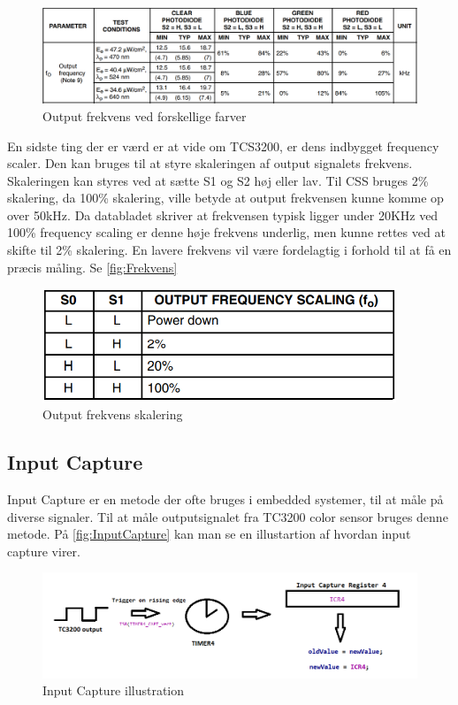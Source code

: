 \begin{figure}[H]
	\centering
	\includegraphics[width = 500pt]{Img/FarveSpektrum.png}
	\caption{Output frekvens ved forskellige farver}
	\label{fig:FarveSpektrum}
\end{figure}

En sidste ting der er værd er at vide om TCS3200, er dens indbygget frequency scaler. Den kan bruges til at styre skaleringen af output signalets frekvens. Skaleringen kan styres ved at sætte S1 og S2 høj eller lav. Til CSS bruges 2\% skalering, da 100\% skalering, ville betyde at output frekvensen kunne komme op over 50kHz. Da databladet skriver at frekvensen typisk ligger under 20KHz ved 100\% frequency scaling er denne høje frekvens underlig, men kunne rettes ved at skifte til 2\% skalering. En lavere frekvens vil være fordelagtig i forhold til at få en præcis måling. \cite{man:TC3200} Se \autoref{fig:Frekvens}

\begin{figure}[H]
	\centering
	\includegraphics[width = 300pt]{Img/Frekvens.png}
	\caption{Output frekvens skalering}
	\label{fig:Frekvens}
\end{figure}

\subsection{Input Capture}
Input Capture er en metode der ofte bruges i embedded systemer, til at måle på diverse signaler. Til at måle outputsignalet fra TC3200 color sensor bruges denne metode. På \autoref{fig:InputCapture} kan man se en illustartion af hvordan input capture virer.

\begin{figure}[H]
	\centering
	\includegraphics[width = 500pt]{Img/InputCapture.png}
	\caption{Input Capture illustration}
	\label{fig:InputCapture}
\end{figure}

